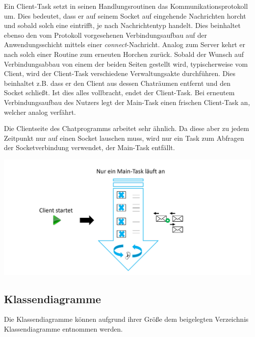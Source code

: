 \documentclass[12pt,a4paper,bibliography=totocnumbered,listof=totocnumbered]{scrartcl}
\begin{document}
Ein Client-Task setzt in seinen Handlungsroutinen das Kommunikationsprotokoll um. Dies bedeutet, dass er auf seinem Socket auf eingehende Nachrichten horcht und sobald solch eine eintrifft, je nach Nachrichtentyp handelt. Dies beinhaltet ebenso den vom Protokoll vorgesehenen Verbindungsaufbau auf der Anwendungsschicht mittels einer \textit{connect}-Nachricht. Analog zum Server kehrt er nach solch einer Routine zum erneuten Horchen zurück. Sobald der Wunsch auf Verbindungsabbau von einem der beiden Seiten gestellt wird, typischerweise vom Client, wird der Client-Task verschiedene Verwaltungsakte durchführen. Dies beinhaltet z.B. dass er den Client aus dessen Chaträumen entfernt und den Socket schließt. Ist dies alles vollbracht, endet der Client-Task. Bei erneutem Verbindungsaufbau des Nutzers legt der Main-Task einen frischen Client-Task an, welcher analog verfährt.

Die Clientseite des Chatprogramms arbeitet sehr ähnlich. Da diese aber zu jedem Zeitpunkt nur auf einen Socket lauschen muss, wird nur ein Task zum Abfragen der Socketverbindung verwendet, der Main-Task entfällt.

\vspace{1em}
\begin{minipage}{\linewidth}
	\centering
	\includegraphics[width=1\linewidth]{img/Implementierungslogik2.png}
	\label{fig:Implementierungslogik Client}
\end{minipage}
\vspace{0.5em}

\subsection{Klassendiagramme}
Die Klassendiagramme können aufgrund ihrer Größe dem beigelegten Verzeichnis 
\glqq Klassendiagramme\grqq{} entnommen werden.

\end{document}
